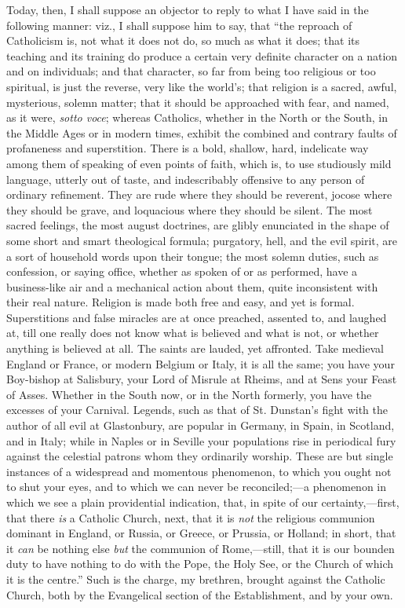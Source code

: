 Today, then, I shall suppose an objector to reply to what I have
said in the following manner: viz., I shall suppose him to say, that
``the reproach of Catholicism is, not what it does not do, so much
as what it does; that its teaching and its training do produce a
certain very definite character on a nation and on individuals; and
that character, so far from being too religious or too spiritual, is
just the reverse, very like the world's; that religion is a sacred,
awful, mysterious, solemn matter; that it should be approached with
fear, and named, as it were, \emph{sotto voce}; whereas Catholics,
whether in the North or the South, in the Middle Ages or in modern
times, exhibit the combined and contrary faults of profaneness and
superstition. There is a bold, shallow, hard, indelicate way among
them of speaking of even points of faith, which is, to use studiously
mild language, utterly out of taste, and indescribably offensive to
any person of ordinary refinement. They are rude where they should be
reverent, jocose where they should be grave, and loquacious where they
should be silent. The most sacred feelings, the most august doctrines,
are glibly enunciated in the shape of some short and smart theological
formula; purgatory, hell, and the evil spirit, are a sort of household
words upon their tongue; the most solemn duties, such as confession,
or saying office, whether as spoken of or as performed, have a
business-like air and a mechanical action about them, quite
inconsistent with their real nature. Religion is made both free and
easy, and yet is formal. Superstitions and false miracles are at once
preached, assented to, and laughed at, till one really does not know
what is believed and what is not, or whether anything is believed at
all. The saints are lauded, yet affronted. Take medieval England or
France, or modern Belgium or Italy, it is all the same; you have your
Boy-bishop at Salisbury, your Lord of Misrule at Rheims, and at Sens
your Feast of Asses. Whether in the South now, or in the North
formerly, you have the excesses of your Carnival. Legends, such as
that of St. Dunstan's fight with the author of all evil at
Glastonbury, are popular in Germany, in Spain, in Scotland, and in
Italy; while in Naples or in Seville your populations rise in
periodical fury against the celestial patrons whom they ordinarily
worship. These are but single instances of a widespread and momentous
phenomenon, to which you ought not to shut your eyes, and to which we
can never be reconciled;—a phenomenon in which we see a plain
providential indication, that, in spite of our certainty,—first, that
there \emph{is} a Catholic Church, next, that it is \emph{not} the religious
communion dominant in England, or Russia, or Greece, or Prussia, or
Holland; in short, that it \emph{can} be nothing else \emph{but} the
communion of Rome,—still, that it is our bounden duty to have nothing
to do with the Pope, the Holy See, or the Church of which it is the
centre.'' Such is the charge, my brethren, brought against the
Catholic Church, both by the Evangelical section of the Establishment,
and by your own.

